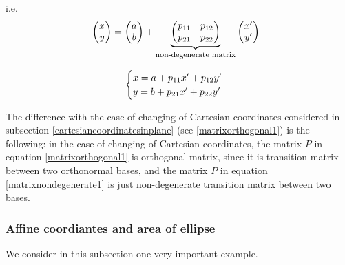 \documentclass[12pt]{article}
\numberwithin{equation}{section}
\begin{document}
i.e. \begin{equation*}
  \begin{pmatrix}
         x \cr
        y\cr
   \end{pmatrix}
         =
  \begin{pmatrix}
         a \cr
        b\cr
   \end{pmatrix}
              +  
         \underbrace
         {
      \begin{pmatrix}
    p_{11} &p_{12}\cr
    p_{21} &p_{22}\cr
         \end{pmatrix}
         }_{\hbox 
    {\footnotesize non-degenerate matrix}}
           \begin{pmatrix}
         x'\cr
        y'\cr
   \end{pmatrix}\,.
\end{equation*}
 
   \begin{equation}\label{changingcartesiancoordinatesinplane}
\begin{cases}
    x=a+p_{11}x'+p_{12}y'\cr
    y=b+p_{21}x'+p_{22}y'\cr
 \end{cases}
   \end{equation}

 The difference with the case of 
changing of Cartesian coordinates
considered in subsection \ref{cartesiancoordinatesinplane}
(see \eqref{matrixorthogonal1}) 
is the following: in the case of changing of Cartesian
 coordinates, the matrix $P$ in equation 
\eqref{matrixorthogonal1} is orthogonal matrix,
since it is transition matrix between two orthonormal
bases, 
and the matrix $P$ in equation \eqref{matrixnondegenerate1}
is just non-degenerate transition matrix between two bases.          

\subsubsection {Affine coordiantes and area of ellipse}\label{area1}

  We consider in this subsection one very important example.
\end{document}
